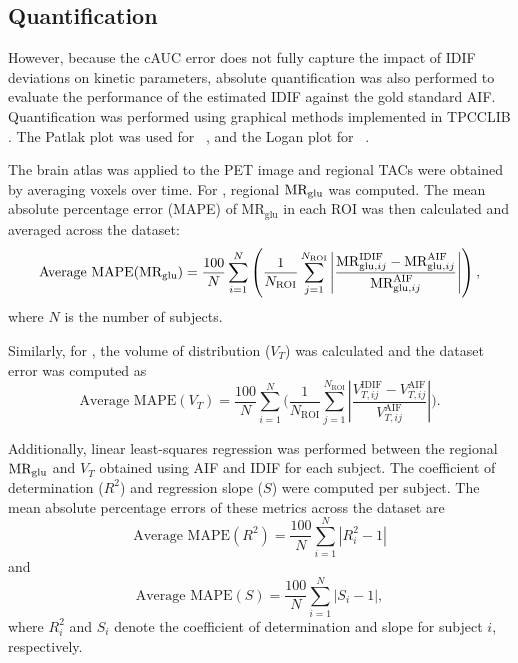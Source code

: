 \subsection{Quantification}
However, because the cAUC error does not fully capture the impact of IDIF deviations on kinetic parameters, absolute quantification was also performed to evaluate the performance of the estimated IDIF against the gold standard AIF.
Quantification was performed using graphical methods implemented in TPCCLIB \cite{oikonen2018tpcclib}.
The Patlak plot was used for \fdg\ \cite{patlak1983graphical}, and the Logan plot for \yohimbine\ \cite{logan1990graphical}.

The brain atlas was applied to the PET image and regional TACs were obtained by averaging voxels over time.
For \fdg, regional \(\text{MR}_{\text{glu}}\) was computed.
The mean absolute percentage error (MAPE) of \(\textrm{MR}_{\textrm{glu}}\) in each ROI was then calculated and averaged across the dataset:
\begin{equation}
	\text{Average MAPE}(\text{MR}_{\text{glu}})= \frac{100}{N} \sum_{i=1}^{N} \left( \frac{1}{N_{\text{ROI}}} \sum_{j=1}^{N_{\text{ROI}}} \left| \frac{\textrm{MR}_{\textrm{glu},ij}^{\textrm{IDIF}} - \textrm{MR}_{\textrm{glu},ij}^{\textrm{AIF}}}{\textrm{MR}_{\textrm{glu},ij}^{\textrm{AIF}}} \right| \right),
\end{equation}
where \(N\) is the number of subjects.

Similarly, for \yohimbine, the volume of distribution (\(V_T\)) was calculated and the dataset error was computed as
\begin{equation}
	\text{Average MAPE}(V_T)
	= \frac{100}{N}
	\sum_{i=1}^{N}
	\biggl(
	\frac{1}{N_{\mathrm{ROI}}}
	\sum_{j=1}^{N_{\mathrm{ROI}}}
	\left|
	\frac{V_{T,ij}^{\mathrm{IDIF}} - V_{T,ij}^{\mathrm{AIF}}}
	{V_{T,ij}^{\mathrm{AIF}}}
	\right|
	\biggr).
\end{equation}

Additionally, linear least-squares regression was performed between the regional \(\text{MR}_{\text{glu}}\) and \(V_T\) obtained using AIF and IDIF for each subject.
The coefficient of determination (\(R^2\)) and regression slope (\(S\)) were computed per subject.
The mean absolute percentage errors of these metrics across the dataset are
\begin{equation}
	\text{Average MAPE}(R^2) = \frac{100}{N} \sum_{i=1}^{N} \left| R^2_i - 1 \right|
\end{equation}
and
\begin{equation}
	\text{Average MAPE}(S) = \frac{100}{N} \sum_{i=1}^{N} \left| S_i - 1 \right|,
\end{equation}
where \(R^2_i\) and \(S_i\) denote the coefficient of determination and slope for subject \(i\), respectively.

